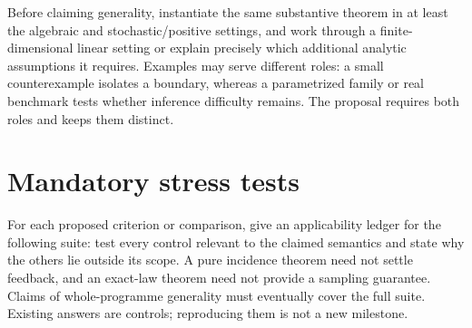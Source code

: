 \documentclass[11pt]{article}
\theoremstyle{remark}
\begin{document}
Before claiming generality, instantiate the same substantive theorem in at least the algebraic and stochastic/positive settings, and work through a finite-dimensional linear setting or explain precisely which additional analytic assumptions it requires. Examples may serve different roles: a small counterexample isolates a boundary, whereas a parametrized family or real benchmark tests whether inference difficulty remains. The proposal requires both roles and keeps them distinct.

\section{Mandatory stress tests}
\label{sec:stress}

For each proposed criterion or comparison, give an applicability ledger for the following suite: test every control relevant to the claimed semantics and state why the others lie outside its scope. A pure incidence theorem need not settle feedback, and an exact-law theorem need not provide a sampling guarantee. Claims of whole-programme generality must eventually cover the full suite. Existing answers are controls; reproducing them is not a new milestone.
\end{document}
